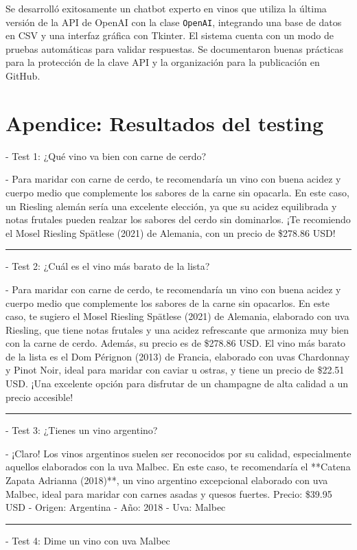\documentclass[conference]{IEEEtran}
\begin{document}
Se desarrolló exitosamente un chatbot experto en vinos que utiliza la última
versión de la API de OpenAI con la clase \texttt{OpenAI}, integrando una base
de datos en CSV y una interfaz gráfica con Tkinter. El sistema cuenta con un
modo de pruebas automáticas para validar respuestas. Se documentaron buenas
prácticas para la protección de la clave API y la organización para la
publicación en GitHub.

\section*{Apendice: Resultados del testing}
- Test 1: ¿Qué vino va bien con carne de cerdo?

- Para maridar con carne de cerdo, te recomendaría un vino con buena acidez y cuerpo medio que complemente los sabores de la carne sin opacarla. En este caso, un Riesling alemán sería una excelente elección, ya que su acidez equilibrada y notas frutales pueden realzar los sabores del cerdo sin dominarlos. ¡Te recomiendo el Mosel Riesling Spätlese (2021) de Alemania, con un precio de \$278.86 USD!
\vspace{0.1cm}
\hrule
\vspace{0.1cm}
- Test 2: ¿Cuál es el vino más barato de la lista?

- Para maridar con carne de cerdo, te recomendaría un vino con buena acidez y cuerpo medio que complemente los sabores de la carne sin opacarlos. En este caso, te sugiero el Mosel Riesling Spätlese (2021) de Alemania, elaborado con uva Riesling, que tiene notas frutales y una acidez refrescante que armoniza muy bien con la carne de cerdo. Además, su precio es de \$278.86 USD.
El vino más barato de la lista es el Dom Pérignon (2013) de Francia, elaborado con uvas Chardonnay y Pinot Noir, ideal para maridar con caviar u ostras, y tiene un precio de \$22.51 USD. ¡Una excelente opción para disfrutar de un champagne de alta calidad a un precio accesible!
\vspace{0.1cm}
\hrule
\vspace{0.1cm}
- Test 3: ¿Tienes un vino argentino?

- ¡Claro! Los vinos argentinos suelen ser reconocidos por su calidad, especialmente aquellos elaborados con la uva Malbec. En este caso, te recomendaría el **Catena Zapata Adrianna (2018)**, un vino argentino excepcional elaborado con uva Malbec, ideal para maridar con carnes asadas y quesos fuertes.
Precio: \$39.95 USD - Origen: Argentina - Año: 2018 - Uva: Malbec
\vspace{0.1cm}
\hrule
\vspace{0.1cm}
- Test 4: Dime un vino con uva Malbec
\end{document}
